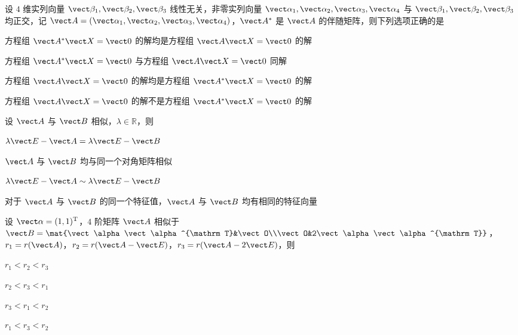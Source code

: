 \begin{question}[index=5]
设 $4$ 维实列向量 $\vect\beta_1,\vect\beta_2,\vect\beta_3$ 线性无关，非零实列向量 $\vect\alpha_1,\vect\alpha_2,\vect\alpha_3,\vect\alpha_4$ 与 $\vect\beta_1,\vect\beta_2,\vect\beta_3$ 均正交，记 $\vect A=(\vect\alpha_1,\vect\alpha_2,\vect\alpha_3,\vect\alpha_4)$，$\vect A^*$ 是 $\vect A$ 的伴随矩阵，则下列选项正确的是
\begin{choices}[columns=2]
\item 方程组 $\vect A^*\vect X=\vect0$ 的解均是方程组 $\vect A\vect X=\vect0$ 的解
\item 方程组 $\vect A^*\vect X=\vect0$ 与方程组 $\vect A\vect X=\vect0$ 同解
\item 方程组 $\vect A\vect X=\vect0$ 的解均是方程组 $\vect A^*\vect X=\vect0$ 的解
\item 方程组 $\vect A\vect X=\vect0$ 的解不是方程组 $\vect A^*\vect X=\vect0$ 的解
\end{choices}
\end{question}
\QuestionBreak

\begin{question}[index=6]
设 $\vect A$ 与 $\vect B$ 相似，$\lambda\in\mathbb R$，则
\begin{choices}[columns=2]
\item $\lambda\vect E-\vect A=\lambda\vect E-\vect B$
\item $\vect A$ 与 $\vect B$ 均与同一个对角矩阵相似
\item $\lambda\vect E-\vect A\sim\lambda\vect E-\vect B$
\item 对于 $\vect A$ 与 $\vect B$ 的同一个特征值，$\vect A$ 与 $\vect B$ 均有相同的特征向量
\end{choices}
\end{question}
\QuestionBreak

\begin{question}[index=7]
设 $\vect\alpha=(1,1)^{\mathrm T}$，$4$ 阶矩阵 $\vect A$ 相似于 $\vect B=\mat{\vect\alpha\vect\alpha^{\mathrm T}&\vect O\\\vect O&2\vect\alpha\vect\alpha^{\mathrm T}}$，$r_1=r(\vect A)$，$r_2=r(\vect A-\vect E)$，$r_3=r(\vect A-2\vect E)$，则
\begin{choices}[columns=4]
\item $r_1<r_2<r_3$
\item $r_2<r_3<r_1$
\item $r_3<r_1<r_2$
\item $r_1<r_3<r_2$
\end{choices}
\end{question}
\QuestionBreak

